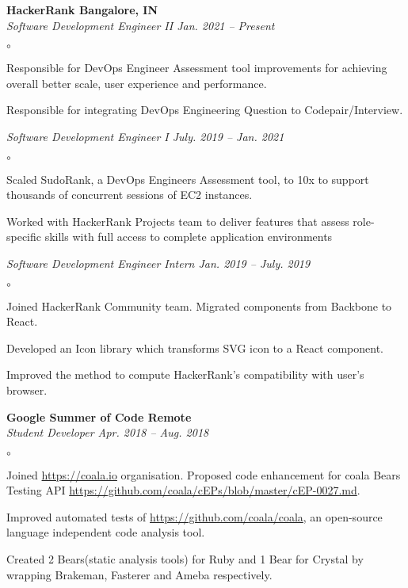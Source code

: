 \documentclass[margin,line]{resume}
\begin{document}
\begin{resume}
    \textbf{HackerRank                                                                     \hfill    Bangalore, IN} \\%
    \emph{Software Development Engineer II                                          \hfill    Jan. 2021 -- Present}   %
    \begin{list}{$\circ$}{}
        \item Responsible for DevOps Engineer Assessment tool improvements for achieving overall better scale, user   %
              experience and performance.
        \item Responsible for integrating DevOps Engineering Question to Codepair/Interview.
    \end{list}
    \emph{Software Development Engineer I                                           \hfill    July. 2019 -- Jan. 2021}%
    \begin{list}{$\circ$}{}
        \item Scaled SudoRank, a DevOps Engineers Assessment tool, to 10x to support thousands of concurrent sessions of
              EC2 instances.
        \item Worked with HackerRank Projects team to deliver features that assess role-specific skills with full     %
              access to complete application environments
    \end{list}
    \emph{Software Development Engineer Intern                                      \hfill    Jan. 2019 -- July. 2019}%
    \begin{list}{$\circ$}{}
        \item Joined HackerRank Community team. Migrated components from Backbone to React.
        \item Developed an Icon library which transforms SVG icon to a React component.
        \item Improved the method to compute HackerRank's compatibility with user's browser.
    \end{list}

    \textbf{Google Summer of Code                                                                 \hfill    Remote} \\%
    \emph{Student Developer                                                         \hfill    Apr. 2018 -- Aug. 2018} %
    \begin{list}{$\circ$}{}
        \item Joined \url{https://coala.io} organisation. Proposed code enhancement for coala Bears Testing API       %
              \url{https://github.com/coala/cEPs/blob/master/cEP-0027.md}.
        \item Improved automated tests of \url{https://github.com/coala/coala}, an open-source language independent
              code analysis tool.
        \item Created 2 Bears(static analysis tools) for Ruby and 1 Bear for Crystal by wrapping Brakeman, Fasterer and
              Ameba respectively.
    \end{list}


\end{resume}
\end{document}
